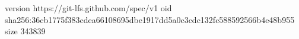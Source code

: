 version https://git-lfs.github.com/spec/v1
oid sha256:36cb1775f383cdea66108695dbe1917dd5a0c3cdc132fc588592566b4e48b955
size 343839
